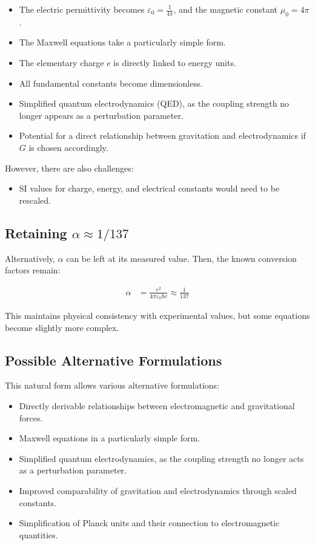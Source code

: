 \documentclass{article}
\begin{document}
	\begin{itemize}
		\item The electric permittivity becomes \( \varepsilon_0 = \frac{1}{4\pi} \), and the magnetic constant \( \mu_0 = 4\pi \).
		\item The Maxwell equations take a particularly simple form.
		\item The elementary charge \( e \) is directly linked to energy units.
		\item All fundamental constants become dimensionless.
		\item Simplified quantum electrodynamics (QED), as the coupling strength no longer appears as a perturbation parameter.
		\item Potential for a direct relationship between gravitation and electrodynamics if \( G \) is chosen accordingly.
	\end{itemize}
	
	However, there are also challenges:
	
	\begin{itemize}
		\item SI values for charge, energy, and electrical constants would need to be rescaled.
	\end{itemize}
	
	\subsection*{Retaining \( \alpha \approx 1/137 \)}
	
	Alternatively, \( \alpha \) can be left at its measured value. Then, the known conversion factors remain:
	
	\begin{align*}
		\alpha &= \frac{e^2}{4\pi \varepsilon_0 \hbar c} \approx \frac{1}{137}
	\end{align*}
	
	This maintains physical consistency with experimental values, but some equations become slightly more complex.
	
	\subsection*{Possible Alternative Formulations}
	
	This natural form allows various alternative formulations:
	
	\begin{itemize}
		\item Directly derivable relationships between electromagnetic and gravitational forces.
		\item Maxwell equations in a particularly simple form.
		\item Simplified quantum electrodynamics, as the coupling strength no longer acts as a perturbation parameter.
		\item Improved comparability of gravitation and electrodynamics through scaled constants.
		\item Simplification of Planck units and their connection to electromagnetic quantities.
	\end{itemize}
	
\end{document}
